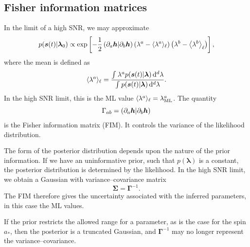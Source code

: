 \subsection{Fisher information matrices}\label{sec:Fisher}

In the limit of a high SNR, we may approximate \citep{Vallisneri2008}
\begin{equation}
p(\boldsymbol{s}(t)|\boldsymbol{\lambda}_0) \propto \exp\left[-\dfrac{1}{2}\left({\partial_a\boldsymbol{h}}\middle|{\partial_b\boldsymbol{h}}\right)\left(\lambda^a - \langle\lambda^a\rangle_\ell\right)\left(\lambda^b - \left\langle\lambda^b\right\rangle_\ell\right)\right],
\label{eq:LSA}
\end{equation}
where the mean is defined as
\begin{equation}
\langle\lambda^a\rangle_\ell = \dfrac{\int_{}^{}{\lambda^a p(\boldsymbol{s}(t)|\boldsymbol{\lambda})}\,\mathrm{d}{^d \lambda}}{\int_{}^{}{p(\boldsymbol{s}(t)|\boldsymbol{\lambda})}\,\mathrm{d}{^d \lambda}}.
\end{equation}
In the high SNR limit, this is the ML value $\langle\lambda^a\rangle_\ell = \lambda^a_\mathrm{ML}$. The quantity
\begin{equation}
\Gamma_{ab} = \left({\partial_a\boldsymbol{h}}\middle|{\partial_b\boldsymbol{h}}\right)
\label{eq:Fisher}
\end{equation}
is the Fisher information matrix (FIM). It controls the variance of the likelihood distribution.

The form of the posterior distribution depends upon the nature of the prior information. If we have an uninformative prior, such that $p(\boldsymbol{\lambda})$ is a constant, the posterior distribution is determined by the likelihood. In the high SNR limit, we obtain a Gaussian with variance--covariance matrix
\begin{equation}
\boldsymbol{\Sigma} = \boldsymbol{\Gamma}^{-1}.
\label{eq:InvFisher}
\end{equation}
The FIM therefore gives the uncertainty associated with the inferred parameters, in this case the ML values.

If the prior restricts the allowed range for a parameter, as is the case for the spin $a_\ast$, then the posterior is a truncated Gaussian, and $\boldsymbol{\Gamma}^{-1}$ may no longer represent the variance--covariance.

